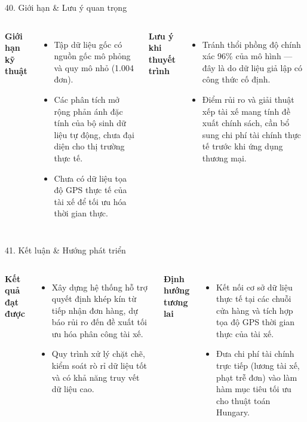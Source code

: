 \documentclass[t, aspectratio=169, 11pt]{beamer}
\newcommand{\blk}[1]{\textbf{\color{hustprimary}#1}}
\begin{document}
\begin{frame}{40. Giới hạn \& Lưu ý quan trọng}
    \begin{columns}[T]
        \blk{Giới hạn kỹ thuật}
        \begin{itemize}
            \item Tập dữ liệu gốc có nguồn gốc mô phỏng và quy mô nhỏ (1.004 đơn).
            \item Các phân tích mở rộng phản ánh đặc tính của bộ sinh dữ liệu tự động, chưa đại diện cho thị trường thực tế.
            \item Chưa có dữ liệu tọa độ GPS thực tế của tài xế để tối ưu hóa thời gian thực.
        \end{itemize}

        \blk{Lưu ý khi thuyết trình}
        \begin{itemize}
            \item Tránh thổi phồng độ chính xác 96\% của mô hình — đây là do dữ liệu giả lập có công thức cố định.
            \item Điểm rủi ro và giải thuật xếp tài xế mang tính đề xuất chính sách, cần bổ sung chi phí tài chính thực tế trước khi ứng dụng thương mại.
        \end{itemize}
    \end{columns}
\end{frame}

\begin{frame}{41. Kết luận \& Hướng phát triển}
    \begin{columns}[T]
        \blk{Kết quả đạt được}
        \begin{itemize}
            \item Xây dựng hệ thống hỗ trợ quyết định khép kín từ tiếp nhận đơn hàng, dự báo rủi ro đến đề xuất tối ưu hóa phân công tài xế.
            \item Quy trình xử lý chặt chẽ, kiểm soát rò rỉ dữ liệu tốt và có khả năng truy vết dữ liệu cao.
        \end{itemize}

        \blk{Định hướng tương lai}
        \begin{itemize}
            \item Kết nối cơ sở dữ liệu thực tế tại các chuỗi cửa hàng và tích hợp tọa độ GPS thời gian thực của tài xế.
            \item Đưa chi phí tài chính trực tiếp (lương tài xế, phạt trễ đơn) vào làm hàm mục tiêu tối ưu cho thuật toán Hungary.
        \end{itemize}
    \end{columns}
\end{frame}

\hustthankyou
\end{document}

